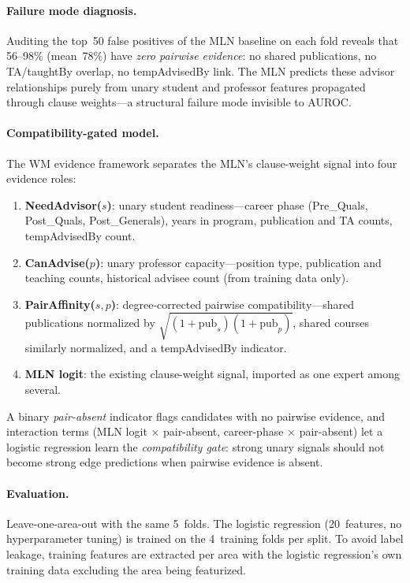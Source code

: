 \documentclass[11pt,openany]{report}
\begin{document}
\paragraph{Failure mode diagnosis.}
Auditing the top~50 false positives of the MLN baseline on each fold
reveals that 56--98\% (mean~78\%) have \emph{zero pairwise evidence}:
no shared publications, no TA/taughtBy overlap, no tempAdvisedBy link.
The MLN predicts these advisor relationships purely from unary student
and professor features propagated through clause weights---a structural
failure mode invisible to AUROC.

\paragraph{Compatibility-gated model.}
The WM evidence framework separates the MLN's clause-weight signal into
four evidence roles:
\begin{enumerate}
\item \textbf{NeedAdvisor($s$)}: unary student readiness---career phase
  (Pre\_Quals, Post\_Quals, Post\_Generals), years in program, publication
  and TA counts, tempAdvisedBy count.
\item \textbf{CanAdvise($p$)}: unary professor capacity---position type,
  publication and teaching counts, historical advisee count (from training
  data only).
\item \textbf{PairAffinity($s,p$)}: degree-corrected pairwise
  compatibility---shared publications normalized by
  $\sqrt{(1 + \text{pub}_s)(1 + \text{pub}_p)}$,
  shared courses similarly normalized, and a tempAdvisedBy indicator.
\item \textbf{MLN logit}: the existing clause-weight signal, imported as
  one expert among several.
\end{enumerate}
A binary \emph{pair-absent} indicator flags candidates with no pairwise
evidence, and interaction terms (MLN logit $\times$ pair-absent,
career-phase $\times$ pair-absent) let a logistic regression learn the
\emph{compatibility gate}: strong unary signals should not become strong
edge predictions when pairwise evidence is absent.

\paragraph{Evaluation.}
Leave-one-area-out with the same 5~folds.  The logistic regression
(20~features, no hyperparameter tuning) is trained on the 4~training
folds per split.  To avoid label leakage, training features are extracted
per area with the logistic regression's own training data excluding the
area being featurized.
\end{document}
